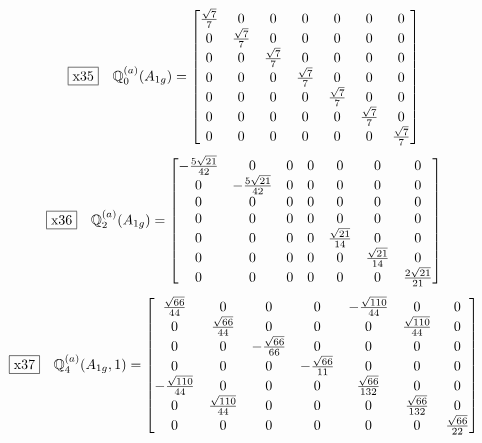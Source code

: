 \documentclass[fleqn,10pt,landscape]{jsarticle}
\begin{document}
\begin{dmath*}
\fbox{x35}\quad \mathbb{Q}_{0}^{(a)}(A_{1g})=\begin{bmatrix} \frac{\sqrt{7}}{7} & 0 & 0 & 0 & 0 & 0 & 0 \\ 0 & \frac{\sqrt{7}}{7} & 0 & 0 & 0 & 0 & 0 \\ 0 & 0 & \frac{\sqrt{7}}{7} & 0 & 0 & 0 & 0 \\ 0 & 0 & 0 & \frac{\sqrt{7}}{7} & 0 & 0 & 0 \\ 0 & 0 & 0 & 0 & \frac{\sqrt{7}}{7} & 0 & 0 \\ 0 & 0 & 0 & 0 & 0 & \frac{\sqrt{7}}{7} & 0 \\ 0 & 0 & 0 & 0 & 0 & 0 & \frac{\sqrt{7}}{7} \end{bmatrix}
\end{dmath*}
\begin{dmath*}
\fbox{x36}\quad \mathbb{Q}_{2}^{(a)}(A_{1g})=\begin{bmatrix} - \frac{5 \sqrt{21}}{42} & 0 & 0 & 0 & 0 & 0 & 0 \\ 0 & - \frac{5 \sqrt{21}}{42} & 0 & 0 & 0 & 0 & 0 \\ 0 & 0 & 0 & 0 & 0 & 0 & 0 \\ 0 & 0 & 0 & 0 & 0 & 0 & 0 \\ 0 & 0 & 0 & 0 & \frac{\sqrt{21}}{14} & 0 & 0 \\ 0 & 0 & 0 & 0 & 0 & \frac{\sqrt{21}}{14} & 0 \\ 0 & 0 & 0 & 0 & 0 & 0 & \frac{2 \sqrt{21}}{21} \end{bmatrix}
\end{dmath*}
\begin{dmath*}
\fbox{x37}\quad \mathbb{Q}_{4}^{(a)}(A_{1g},1)=\begin{bmatrix} \frac{\sqrt{66}}{44} & 0 & 0 & 0 & - \frac{\sqrt{110}}{44} & 0 & 0 \\ 0 & \frac{\sqrt{66}}{44} & 0 & 0 & 0 & \frac{\sqrt{110}}{44} & 0 \\ 0 & 0 & - \frac{\sqrt{66}}{66} & 0 & 0 & 0 & 0 \\ 0 & 0 & 0 & - \frac{\sqrt{66}}{11} & 0 & 0 & 0 \\ - \frac{\sqrt{110}}{44} & 0 & 0 & 0 & \frac{\sqrt{66}}{132} & 0 & 0 \\ 0 & \frac{\sqrt{110}}{44} & 0 & 0 & 0 & \frac{\sqrt{66}}{132} & 0 \\ 0 & 0 & 0 & 0 & 0 & 0 & \frac{\sqrt{66}}{22} \end{bmatrix}
\end{dmath*}
\end{document}
